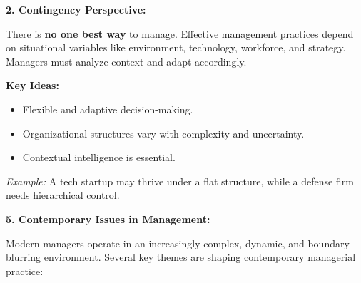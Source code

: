\documentclass[10pt,a4paper]{book}
\begin{document}
\vspace{0.5cm}

\textbf{2. Contingency Perspective:}

There is \textbf{no one best way} to manage. Effective management practices depend on situational variables like environment, technology, workforce, and strategy. Managers must analyze context and adapt accordingly.

\textbf{Key Ideas:}
\begin{itemize}
    \item Flexible and adaptive decision-making.
    \item Organizational structures vary with complexity and uncertainty.
    \item Contextual intelligence is essential.
\end{itemize}

\textit{Example:} A tech startup may thrive under a flat structure, while a defense firm needs hierarchical control.

\vspace{0.5cm}

\textbf{5. Contemporary Issues in Management:}

Modern managers operate in an increasingly complex, dynamic, and boundary-blurring environment. Several key themes are shaping contemporary managerial practice:
\end{document}
